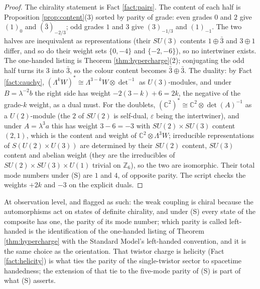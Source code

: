 \documentclass[11pt]{article}
\theoremstyle{definition}
\newcommand{\C}{\mathbb{C}}
\begin{document}
\begin{proof}
The chirality statement is Fact \ref{fact:pairs}. The content of each half is Proposition \ref{prop:content}(3) sorted by parity of grade: even grades $0$ and $2$ give $(1)_{0}$ and $(\bar{3})_{-2/3}$; odd grades $1$ and $3$ give $(3)_{-1/3}$ and $(1)_{-1}$. The two halves are inequivalent as representations (their $SU(3)$ contents $1 \oplus \bar{3}$ and $3 \oplus 1$ differ, and so do their weight sets $\{0, -4\}$ and $\{-2, -6\}$), so no intertwiner exists. The one-handed listing is Theorem \ref{thm:hypercharge}(2); conjugating the odd half turns its $3$ into $\bar{3}$, so the colour content becomes $\bar{3} \oplus \bar{3}$. The duality: by Fact \ref{fact:cauchy}, $(\Lambda^{k}W)^{*} \cong \Lambda^{3-k}W \otimes \det^{-1}$ as $U(3)$-modules, and under $B = \lambda^{-2}b$ the right side has weight $-2(3-k) + 6 = 2k$, the negative of the grade-$k$ weight, as a dual must. For the doublets, $(\C^{2})^{*} \cong \C^{2} \otimes \det(A)^{-1}$ as a $U(2)$-module (the $2$ of $SU(2)$ is self-dual, $\varepsilon$ being the intertwiner), and under $A = \lambda^{3}a$ this has weight $3 - 6 = -3$ with $SU(2) \times SU(3)$ content $(2, 1)$, which is the content and weight of $\C^{2} \otimes \Lambda^{3}W$; irreducible representations of $S(U(2) \times U(3))$ are determined by their $SU(2)$ content, $SU(3)$ content and abelian weight (they are the irreducibles of $SU(2) \times SU(3) \times U(1)$ trivial on $\mathbb{Z}_{6}$), so the two are isomorphic. Their total mode numbers under (S) are $1$ and $4$, of opposite parity. The script checks the weights $+2k$ and $-3$ on the explicit duals.
\end{proof}

At observation level, and flagged as such: the weak coupling is chiral because the automorphisms act on states of definite chirality, and under (S) every state of the composite has one, the parity of its mode number; which parity is called left-handed is the identification of the one-handed listing of Theorem \ref{thm:hypercharge} with the Standard Model's left-handed convention, and it is the same choice as the orientation. That twistor charge is helicity (Fact \ref{fact:helicity}) is what ties the parity of the single-twistor sector to spacetime handedness; the extension of that tie to the five-mode parity of (S) is part of what (S) asserts.
\end{document}
